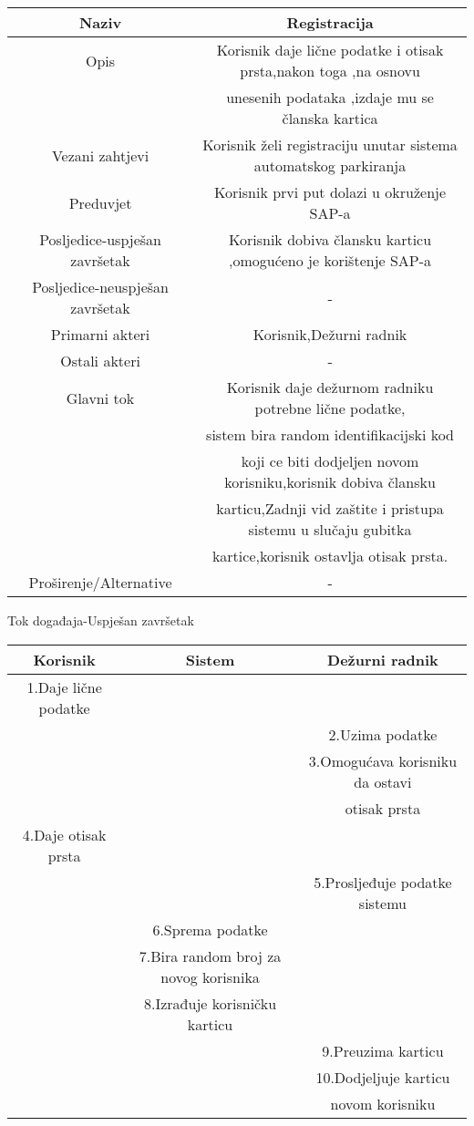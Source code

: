 \documentclass[12pt]{article}
\begin{document}
\begin{center}
\begin{tabular}{|c|c|}
\hline
Naziv&Registracija\\
\hline
Opis&Korisnik daje lične podatke i otisak prsta,nakon toga ,na osnovu\\&unesenih podataka ,izdaje mu se članska kartica\\
\hline
Vezani zahtjevi&Korisnik želi registraciju unutar sistema automatskog parkiranja \\
\hline
Preduvjet&Korisnik prvi put dolazi u okruženje SAP-a\\
\hline
Posljedice-uspješan završetak&Korisnik dobiva člansku karticu ,omogućeno je korištenje SAP-a\\
\hline
Posljedice-neuspješan završetak&-\\
\hline
Primarni akteri&Korisnik,Dežurni radnik\\
\hline
Ostali akteri&-\\
\hline
Glavni tok&Korisnik daje dežurnom radniku potrebne lične podatke,\\&sistem bira random identifikacijski kod\\& koji ce biti dodjeljen novom korisniku,korisnik dobiva člansku\\& karticu,Zadnji vid zaštite i pristupa sistemu u slučaju gubitka\\& kartice,korisnik ostavlja otisak prsta.\\
\hline
Proširenje/Alternative&-\\
\hline
\end{tabular}
\newline\newline
Tok događaja-Uspješan završetak\newline\newline
\begin{tabular}{|c|c|c|}
\hline
Korisnik&Sistem&Dežurni radnik\\
\hline
1.Daje lične podatke&&\\
\hline
&&2.Uzima podatke\\
\hline
&&3.Omogućava korisniku da ostavi\\&& otisak prsta\\
\hline
4.Daje otisak prsta&&\\
\hline
&&5.Prosljeđuje podatke sistemu\\
\hline
&6.Sprema podatke&\\
\hline
&7.Bira random broj za novog korisnika&\\
\hline
&8.Izrađuje korisničku karticu&\\
\hline
&&9.Preuzima karticu\\
\hline
&&10.Dodjeljuje karticu\\&&novom korisniku\\
\hline
\end{tabular}
\end{center}
\end{document}
